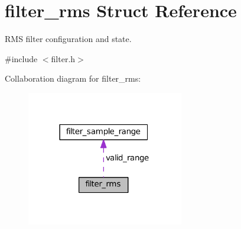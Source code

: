 \hypertarget{structfilter__rms}{}\section{filter\+\_\+rms Struct Reference}
\label{structfilter__rms}


R\+M\+S filter configuration and state.  




{\ttfamily \#include $<$filter.\+h$>$}



Collaboration diagram for filter\+\_\+rms\+:\nopagebreak
\begin{figure}[H]
\begin{center}
\leavevmode
\includegraphics[width=194pt]{structfilter__rms__coll__graph}
\end{center}
\end{figure}
